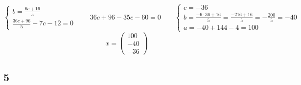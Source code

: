 $$
\begin{cases}
    b = \frac{6c + 16}5 \\
    \frac{36c + 96}5 - 7c - 12 = 0
\end{cases} \qquad 36c + 96 - 35c - 60 = 0 \qquad
\begin{cases}
	c = -36 \\
    b = \frac{-6 \cdot 36 + 16}5 = \frac{-216 + 16}5 = -\frac{200}5 = -40 \\
    a = -40 + 144 - 4 = 100
\end{cases} $$
$$ x =
\begin{pmatrix}
	100 \\
    -40 \\
    -36
\end{pmatrix} $$

\subsection{5}

